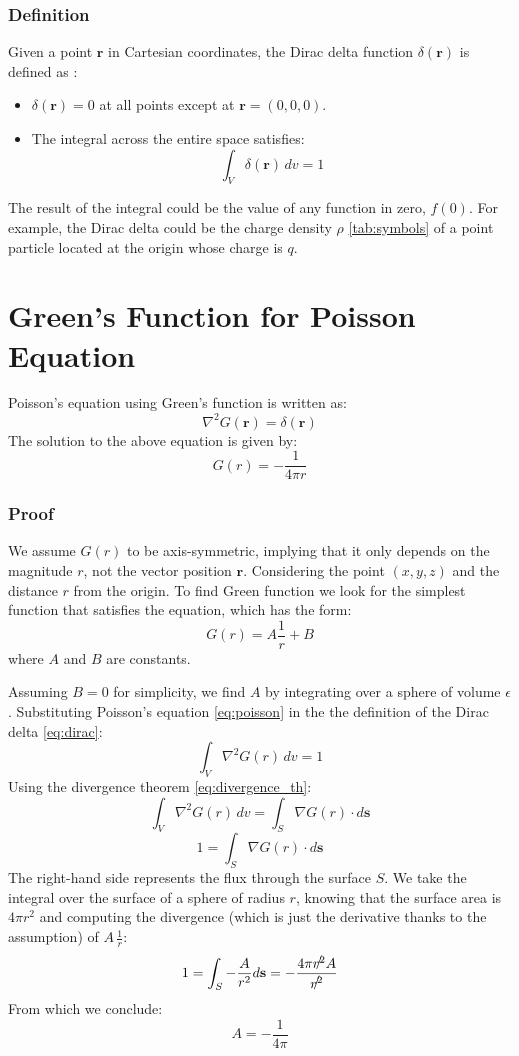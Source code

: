 \subsubsection{Definition}
Given a point \(\mathbf{r}\) in Cartesian coordinates, the Dirac delta function 
\(\delta(\mathbf{r})\) is defined as \cite{book-magnetism2}:
\begin{itemize}
    \item \(\delta(\mathbf{r}) = 0\) at all points except at \(\mathbf{r} = 
    (0,0,0)\).
    \item The integral across the entire space satisfies:
    \begin{equation}
    \int_V \delta(\mathbf{r}) \, dv = 1
    \label{eq:dirac}
    \end{equation}
\end{itemize}

The result of the integral could be the value of any function in zero, $f(0)$.
For example, the Dirac delta could be the charge density $\rho$ \ref{tab:symbols} 
of a point particle located at the origin whose charge is \(q\).

\section{Green's Function for Poisson Equation}
Poisson's equation using Green's function is written as:
\begin{equation}
\nabla^2 G(\mathbf{r}) = \delta(\mathbf{r})
\label{eq:poisson}
\end{equation}
The solution to the above equation is given by:
\[
G(r) =  - \frac{1}{4 \pi r}
\]
\subsubsection{Proof}
We assume \(G(r)\) to be axis-symmetric, implying that it only depends on the 
magnitude $r$, not the vector position $\mathbf{r}$.
Considering the point \((x,y,z)\) and the distance \(r\) from the origin.
To find Green function we look for the simplest function that satisfies the 
equation, which has the form:
\[
G(r) = A \frac{1}{r} + B
\]
where \(A\) and \(B\) are constants. 

Assuming \(B = 0\) for simplicity, we find \(A\) by integrating over a sphere of 
volume $\epsilon$.
Substituting Poisson's equation \ref{eq:poisson} in the the definition of the 
Dirac delta \ref{eq:dirac}:
\[
\int_V \nabla^2 G(r) \, dv = 1 
\]
Using the divergence theorem \ref{eq:divergence_th}:
\[
\int_V \nabla^2 G(r) \, dv = \int_S \nabla G(r) \cdot d\mathbf{s} 
\]
\[
1 = \int_S \nabla G(r) \cdot d\mathbf{s} 
\]
The right-hand side represents the flux through the surface \(S\). We take the 
integral over the surface of a sphere of radius \(r\), knowing that the surface 
area is \(4 \pi r^2\) and computing the divergence (which is just the derivative 
thanks to the assumption) of $A \, \frac{1}{r}$:
\[
1 = \int_S - \frac{A}{r^2} d\mathbf{s} = - \frac{4 \pi \slashed{r^2} 
A}{\slashed{r^2}}
\]
From which we conclude:
\[
A = - \frac{1}{4 \pi}
\]
